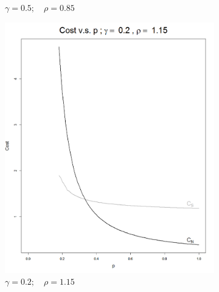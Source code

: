 \documentclass[11pt]{article}
\numberwithin{equation}{section}
\begin{document}
\begin{figure}[h!]
\begin{subfigure}[b]{0.49\textwidth}
		\caption{$\gamma=0.5;\quad\rho=0.85$}
		\label{cost_vs_p_05_085}
	\end{subfigure}
          
	\begin{subfigure}[b]{0.49\textwidth}
	\includegraphics[width=\textwidth]{cost_vs_p_02_115}
		\caption{$\gamma=0.2;\quad\rho=1.15$}
		\label{cost_vs_p_02_115}
	\end{subfigure}
	\begin{subfigure}[b]{0.49\textwidth}

\end{subfigure}
\end{figure}
\end{document}
